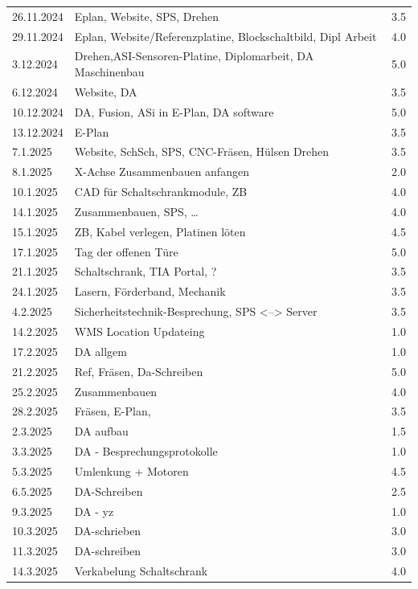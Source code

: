\begin{longtable}{|l|p{10cm}|r|}
26.11.2024	&Eplan, Website, SPS, Drehen& 3.5\\
29.11.2024	&Eplan, Website/Referenzplatine, Blockschaltbild, Dipl Arbeit& 4.0\\
3.12.2024	&Drehen,ASI-Sensoren-Platine, Diplomarbeit, DA Maschinenbau& 5.0\\
6.12.2024	&Website, DA &3.5\\
10.12.2024	&DA, Fusion, ASi in E-Plan, DA software	&5.0\\
13.12.2024	&E-Plan &3.5\\
7.1.2025	&Website, SchSch, SPS, CNC-Fräsen, Hülsen Drehen&	3.5\\
8.1.2025	&X-Achse Zusammenbauen anfangen	&2.0\\
10.1.2025	&CAD für Schaltschrankmodule, ZB	&4.0\\
14.1.2025	&Zusammenbauen, SPS, …&	4.0\\
15.1.2025	&ZB, Kabel verlegen, Platinen löten&	4.5\\
17.1.2025	&Tag der offenen Türe	&5.0\\
21.1.2025	&Schaltschrank, TIA Portal, ?&	3.5\\
24.1.2025	&Lasern, Förderband, Mechanik	&3.5\\
4.2.2025	&Sicherheitstechnik-Besprechung, SPS <--> Server	&3.5\\
14.2.2025	&WMS Location Updateing	&1.0\\
17.2.2025	&DA allgem	&1.0\\

21.2.2025	&Ref, Fräsen, Da-Schreiben	&5.0\\
25.2.2025	&Zusammenbauen&	4.0\\
28.2.2025	&Fräsen, E-Plan,&	3.5\\
2.3.2025	&DA aufbau	&1.5\\
3.3.2025	&DA - Besprechungsprotokolle&	1.0\\

5.3.2025	&Umlenkung + Motoren&	4.5\\
6.5.2025	&DA-Schreiben  &	2.5\\
9.3.2025	&DA - yz	&1.0\\

10.3.2025	&DA-schrieben	&3.0\\
11.3.2025	&DA-schreiben	&3.0\\
14.3.2025	&Verkabelung Schaltschrank	&4.0\\


    
\end{longtable}


\newpage
